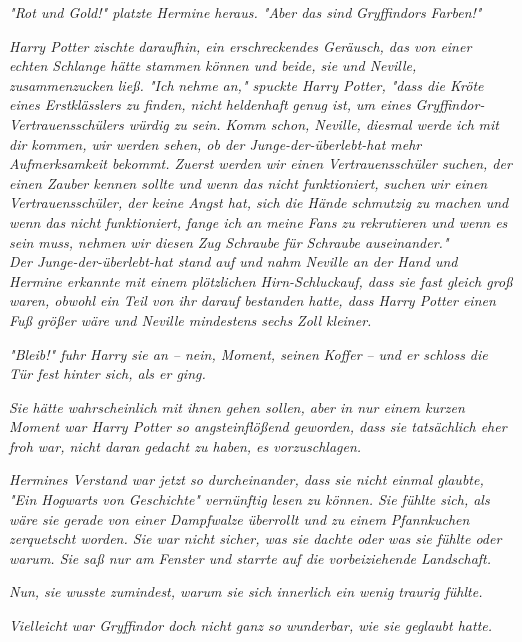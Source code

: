 {\emph{"\emph{Rot und Gold!}" platzte Hermine heraus. "Aber das sind} \emph{\emph{Gryffindors}} \emph{Farben!"}

\emph{Harry Potter} \emph{\emph{zischte}} \emph{daraufhin, ein erschreckendes Geräusch, das von einer echten Schlange hätte stammen können und beide, sie und Neville, zusammenzucken ließ. "Ich} \emph{\emph{nehme an}\emph{,}" spuckte Harry Potter, "dass die Kröte eines Erstklässlers zu finden, nicht} \emph{\emph{heldenhaft}} \emph{genug ist, um eines} \emph{\emph{Gryffindor}-Vertrauensschülers würdig zu sein. Komm schon, Neville, diesmal werde} \emph{\emph{ich}} \emph{mit dir kommen, wir werden sehen, ob der Junge-der-überlebt-hat mehr Aufmerksamkeit bekommt. Zuerst werden wir einen} \emph{Vertrauensschüler suchen, der einen Zauber kennen sollte und wenn das nicht funktioniert, suchen wir einen Vertrauensschüler, der keine Angst hat, sich die Hände schmutzig zu machen und wenn} \emph{\emph{das}} \emph{nicht funktioniert, fange ich an meine Fans zu rekrutieren und wenn es sein muss, nehmen wir diesen Zug Schraube für Schraube auseinander."}\\ \emph{Der Junge-der-überlebt-hat stand auf und nahm Neville an der Hand und Hermine erkannte mit einem plötzlichen Hirn-Schluckauf, dass sie fast gleich groß waren, obwohl ein Teil von ihr darauf bestanden hatte, dass Harry Potter einen Fuß größer wäre und Neville mindestens sechs Zoll kleiner.}

\emph{"\emph{Bleib!}" fuhr Harry sie an -- nein, Moment, seinen} \emph{\emph{Koffer}} \emph{-- und er schloss die Tür fest hinter sich, als er ging.}

\emph{Sie hätte wahrscheinlich mit ihnen gehen sollen, aber in nur einem kurzen Moment war Harry Potter so angsteinflößend geworden, dass sie tatsächlich eher froh war, nicht daran gedacht zu haben, es vorzuschlagen.}

\emph{Hermines Verstand war jetzt so durcheinander, dass sie nicht einmal glaubte, "Ein Hogwarts von Geschichte" vernünftig lesen zu können. Sie fühlte sich, als wäre sie gerade von einer Dampfwalze überrollt und zu einem Pfannkuchen zerquetscht worden. Sie war nicht sicher, was sie dachte oder was sie fühlte oder warum. Sie saß nur am Fenster und starrte auf die vorbeiziehende Landschaft.}

\emph{Nun, sie wusste zumindest, warum sie sich innerlich ein wenig traurig fühlte.}

\emph{Vielleicht war Gryffindor doch nicht ganz so wunderbar, wie sie geglaubt hatte.}

}

